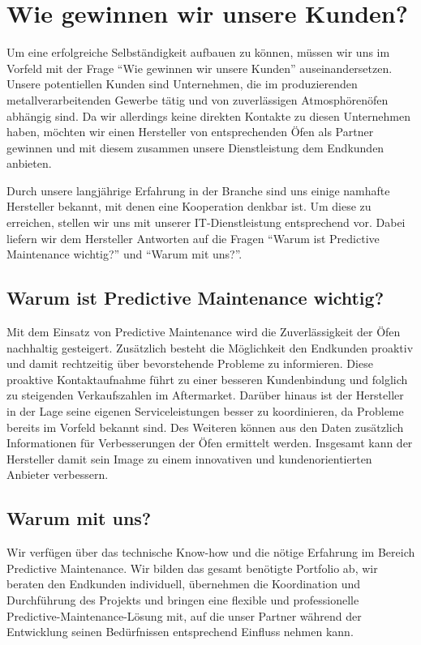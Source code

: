 \newpage
\section{Wie gewinnen wir unsere Kunden?}
Um eine erfolgreiche Selbständigkeit aufbauen zu können, müssen wir uns im Vorfeld mit der Frage "`Wie gewinnen wir unsere Kunden"' auseinandersetzen.
Unsere potentiellen Kunden sind Unternehmen, die im produzierenden metallverarbeitenden Gewerbe tätig und von zuverlässigen Atmosphörenöfen abhängig sind. Da wir allerdings keine direkten Kontakte zu diesen Unternehmen haben, möchten wir einen Hersteller von entsprechenden Öfen als Partner gewinnen und mit diesem zusammen unsere Dienstleistung dem Endkunden anbieten.

Durch unsere langjährige Erfahrung in der Branche sind uns einige namhafte Hersteller bekannt, mit denen eine Kooperation denkbar ist. Um diese zu erreichen, stellen wir uns mit unserer IT-Dienstleistung entsprechend vor. Dabei liefern wir dem Hersteller Antworten auf die Fragen "`Warum ist Predictive Maintenance wichtig?"' und "`Warum mit uns?"'.

\subsection{Warum ist Predictive Maintenance wichtig?}
Mit dem Einsatz von Predictive Maintenance wird die Zuverlässigkeit der Öfen nachhaltig gesteigert. Zusätzlich besteht die Möglichkeit den Endkunden proaktiv und damit rechtzeitig über bevorstehende Probleme zu informieren. Diese proaktive Kontaktaufnahme führt zu einer besseren Kundenbindung und folglich zu steigenden Verkaufszahlen im Aftermarket. Darüber hinaus ist der Hersteller in der Lage seine eigenen Serviceleistungen besser zu koordinieren, da Probleme bereits im Vorfeld bekannt sind. Des Weiteren können aus den Daten zusätzlich Informationen für Verbesserungen der Öfen ermittelt werden.
Insgesamt kann der Hersteller damit sein Image zu einem innovativen und kundenorientierten Anbieter verbessern.

\subsection{Warum mit uns?}
Wir verfügen über das technische Know-how und die nötige Erfahrung im Bereich Predictive Maintenance. Wir bilden das gesamt benötigte Portfolio ab, wir beraten den Endkunden individuell, übernehmen die Koordination und Durchführung des Projekts und bringen eine flexible und professionelle Predictive-Maintenance-Lösung mit, auf die unser Partner während der Entwicklung seinen Bedürfnissen entsprechend Einfluss nehmen kann. 


